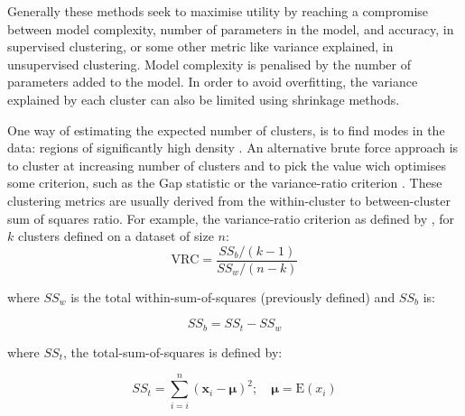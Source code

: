 

Generally these methods seek to maximise utility by reaching a compromise between model complexity, number of parameters in the model,
and accuracy, in supervised clustering, or some other metric like variance explained, in unsupervised clustering.
Model complexity is penalised by the number of parameters added to the model.
In order to avoid overfitting, the variance explained by each cluster can also be limited using shrinkage methods.

One way of estimating the expected number of clusters, is to find modes in the data: regions of significantly high density \citep{Duong:2008eu,JING:2012ek}.
An alternative brute force approach is to cluster at increasing number of clusters 
and to pick the value wich optimises some criterion, such as the Gap statistic \citep{Tibshirani:2001fj}
or the variance-ratio criterion \citep{Calinski:1974bt}.
These clustering metrics are usually derived from the within-cluster to between-cluster sum of squares ratio.
For example, the variance-ratio criterion as defined by \citet{Calinski:1974bt}, for $k$ clusters defined on a dataset of size $n$:
\[
  \text{VRC} = \frac{SS_{b}/(k-1)}{SS_{w}/(n-k)}
\]

where $SS_{w}$ is the total within-sum-of-squares (previously defined) and $SS_{b}$ is:

\[
   SS_{b} = SS_{t} - SS_{w}
\]

where $SS_{t}$, the total-sum-of-squares is defined by:

\[
  SS_{t} = \sum_{i=i}^{n} ( \mathbf x_i - \boldsymbol\mu )^2 ; \quad \boldsymbol\mu=\text{E}(x_i)
\]

